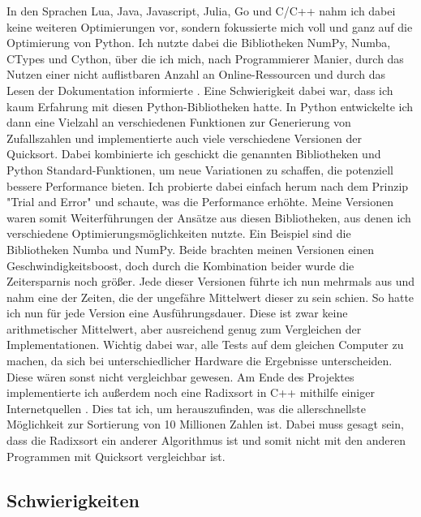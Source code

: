 \documentclass[11pt,a4paper]{article}
\begin{document}
In den Sprachen Lua, Java, Javascript, Julia, Go und C/C++ nahm ich dabei keine weiteren Optimierungen vor,
sondern fokussierte mich voll und ganz auf die Optimierung von Python.
Ich nutzte dabei die Bibliotheken NumPy, Numba, CTypes und Cython, über die ich mich, nach Programmierer
Manier, durch das Nutzen einer nicht auflistbaren Anzahl an Online-Ressourcen und
durch das Lesen der Dokumentation informierte \cite{cythondocs} \cite{cythondocsnumpy} \cite{cythonctypes}.
Eine Schwierigkeit dabei war, dass ich kaum Erfahrung mit diesen Python-Bibliotheken hatte.
In Python entwickelte ich dann eine Vielzahl an verschiedenen Funktionen zur Generierung von Zufallszahlen
und implementierte auch viele verschiedene Versionen der Quicksort. Dabei kombinierte ich geschickt die
genannten Bibliotheken und Python Standard-Funktionen, um neue Variationen zu schaffen,
die potenziell bessere Performance bieten.
Ich probierte dabei einfach herum nach dem Prinzip "Trial and Error" und schaute, was
die Performance erhöhte.
Meine Versionen waren somit Weiterführungen der Ansätze aus diesen Bibliotheken, aus denen ich
verschiedene Optimierungsmöglichkeiten nutzte.
Ein Beispiel sind die Bibliotheken Numba und NumPy. Beide brachten meinen Versionen einen
Geschwindigkeitsboost, doch durch die Kombination beider wurde die Zeitersparnis noch größer.
Jede dieser Versionen führte ich nun mehrmals aus und nahm eine der Zeiten, die der ungefähre
Mittelwert dieser zu sein schien. So hatte ich nun für jede Version eine Ausführungsdauer.
Diese ist zwar keine arithmetischer Mittelwert, aber ausreichend genug zum Vergleichen
der Implementationen. Wichtig dabei war, alle Tests auf dem gleichen Computer zu machen,
da sich bei unterschiedlicher Hardware
die Ergebnisse unterscheiden. Diese wären sonst nicht vergleichbar gewesen.
Am Ende des Projektes implementierte ich außerdem noch eine Radixsort in C++ mithilfe
einiger Internetquellen \cite{terdiman} \cite{michael} \cite{intelavxdocs} \cite{avxguide}.
Dies tat ich, um herauszufinden, was die allerschnellste Möglichkeit zur Sortierung von 10 Millionen
Zahlen ist. Dabei muss gesagt sein, dass die Radixsort ein anderer
Algorithmus ist und somit nicht mit den anderen Programmen mit Quicksort vergleichbar ist.

\subsection{Schwierigkeiten}
\end{document}
